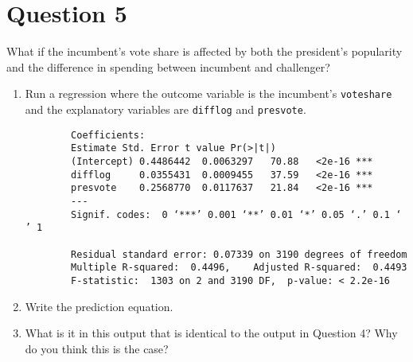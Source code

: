 \documentclass[12pt,letterpaper]{article}
\begin{document}
	\newpage	

\section*{Question 5}
\noindent What if the incumbent's vote share is affected by both the president's popularity and the difference in spending between incumbent and challenger? 
	\begin{enumerate}
		\item Run a regression where the outcome variable is the incumbent's \texttt{voteshare} and the explanatory variables are \texttt{difflog} and \texttt{presvote}.	\vspace{1cm}
		
		\begin{verbatim}
		Coefficients:
		Estimate Std. Error t value Pr(>|t|)    
		(Intercept) 0.4486442  0.0063297   70.88   <2e-16 ***
		difflog     0.0355431  0.0009455   37.59   <2e-16 ***
		presvote    0.2568770  0.0117637   21.84   <2e-16 ***
		---
		Signif. codes:  0 ‘***’ 0.001 ‘**’ 0.01 ‘*’ 0.05 ‘.’ 0.1 ‘ ’ 1
		
		Residual standard error: 0.07339 on 3190 degrees of freedom
		Multiple R-squared:  0.4496,	Adjusted R-squared:  0.4493 
		F-statistic:  1303 on 2 and 3190 DF,  p-value: < 2.2e-16
			\end{verbatim}
		
		\item Write the prediction equation.	\vspace{5cm}
		\item What is it in this output that is identical to the output in Question 4? Why do you think this is the case?
	\end{enumerate}
\end{document}
